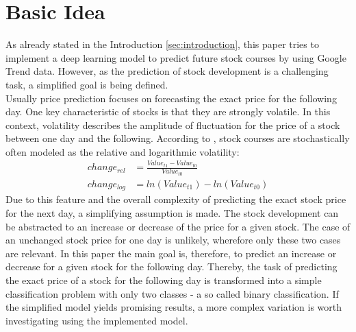 \section{Basic Idea}
\label{sec:idea}
As already stated in the Introduction \ref{sec:introduction}, this paper tries to implement a deep learning model to predict future stock courses by using Google Trend data. However, as the prediction of stock development is a challenging task, a simplified goal is being defined. 
\\
Usually price prediction focuses on forecasting the exact price for the following day. One key characteristic of stocks is that they are strongly volatile. In this context, volatility describes the amplitude of fluctuation for the price of a stock between one day and the following. According to \cite{volatility}, stock courses are stochastically often modeled as the relative and logarithmic volatility: 
\begin{align}
change_{rel} &= \frac{Value_{t1} - Value_{t0}}{Value_{t0}} \\ 
change_{log} &= ln(Value_{t1}) - ln(Value_{t0})
\end{align}
Due to this feature and the overall complexity of predicting the exact stock price for the next day, a simplifying assumption is made. The stock development can be abstracted to an increase or decrease of the price for a given stock. The case of an unchanged stock price for one day is unlikely, wherefore only these two cases are relevant. In this paper the main goal is, therefore, to predict an increase or decrease for a given stock for the following day. Thereby, the task of predicting the exact price of a stock for the following day is transformed into a simple classification problem with only two classes - a so called binary classification. If the simplified model yields promising results, a more complex variation is worth investigating using the implemented model. 
